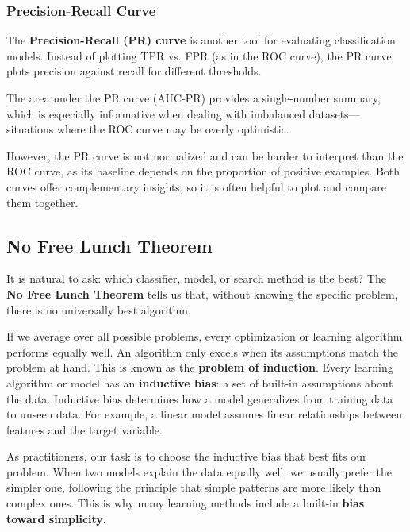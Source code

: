 \subsubsection{Precision-Recall Curve}
The \textbf{Precision-Recall (PR) curve} is another tool for evaluating classification models.
Instead of plotting TPR vs. FPR (as in the ROC curve), the PR curve plots precision against recall for different thresholds.

The area under the PR curve (AUC-PR) provides a single-number summary, which is especially informative when dealing with imbalanced datasets—situations where the ROC curve may be overly optimistic.

However, the PR curve is not normalized and can be harder to interpret than the ROC curve, as its baseline depends on the proportion of positive examples.
Both curves offer complementary insights, so it is often helpful to plot and compare them together.

\subsection{No Free Lunch Theorem}

It is natural to ask: which classifier, model, or search method is the best?
The \textbf{No Free Lunch Theorem} tells us that, without knowing the specific problem, there is no universally best algorithm.

If we average over all possible problems, every optimization or learning algorithm performs equally well.
An algorithm only excels when its assumptions match the problem at hand.
This is known as the \textbf{problem of induction}.
Every learning algorithm or model has an \textbf{inductive bias}: a set of built-in assumptions about the data.
Inductive bias determines how a model generalizes from training data to unseen data.
For example, a linear model assumes linear relationships between features and the target variable.

As practitioners, our task is to choose the inductive bias that best fits our problem.
When two models explain the data equally well, we usually prefer the simpler one, following the principle that simple patterns are more likely than complex ones.
This is why many learning methods include a built-in \textbf{bias toward simplicity}.